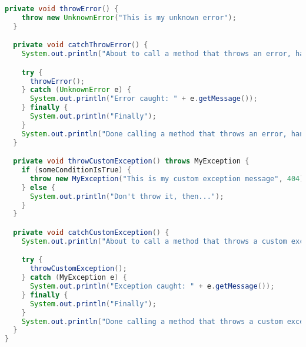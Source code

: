 \begin{lstlisting}[language=Java]
  private void throwError() {
    throw new UnknownError("This is my unknown error");
  }

  private void catchThrowError() {
    System.out.println("About to call a method that throws an error, handled");

    try {
      throwError();
    } catch (UnknownError e) {
      System.out.println("Error caught: " + e.getMessage());
    } finally {
      System.out.println("Finally");
    }
    System.out.println("Done calling a method that throws an error, handled");
  }

  private void throwCustomException() throws MyException {
    if (someConditionIsTrue) {
      throw new MyException("This is my custom exception message", 404);
    } else {
      System.out.println("Don't throw it, then...");
    }
  }

  private void catchCustomException() {
    System.out.println("About to call a method that throws a custom exception, handled");

    try {
      throwCustomException();
    } catch (MyException e) {
      System.out.println("Exception caught: " + e.getMessage());
    } finally {
      System.out.println("Finally");
    }
    System.out.println("Done calling a method that throws a custom exception, handled");
  }
}

\end{lstlisting}